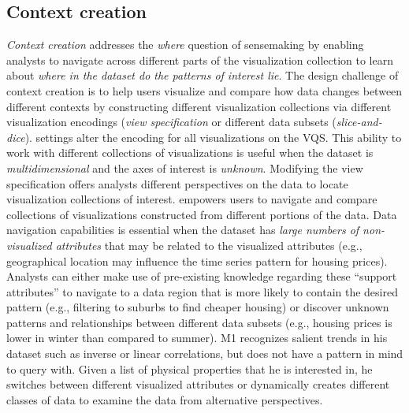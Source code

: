   \subsection{Context creation}
  \textit{Context creation} addresses the \textit{where} question of sensemaking by enabling analysts to navigate across different parts of the visualization collection to learn about \textit{where in the dataset do the patterns of interest lie}. The design challenge of context creation is to help users visualize and compare how data changes between different contexts by constructing different visualization collections via different visualization encodings (\textit{view specification} or different data subsets (\textit{slice-and-dice}).%
   settings alter the encoding for all visualizations on the VQS. This ability to work with different collections of visualizations is useful when the dataset is \emph{multidimensional} and the axes of interest is \emph{unknown}. Modifying the view specification offers analysts different perspectives on the data to locate visualization collections of interest.
   empowers users to navigate and compare collections of visualizations constructed from different portions of the data. Data navigation capabilities is essential when the dataset has \emph{large numbers of non-visualized attributes} that may be related to the visualized attributes (e.g., geographical location may influence the time series pattern for housing prices). Analysts can either make use of pre-existing knowledge regarding these ``support attributes'' to navigate to a data region that is more likely to contain the desired pattern (e.g., filtering to suburbs to find cheaper housing) or discover unknown patterns and relationships between different data subsets (e.g., housing prices is lower in winter than compared to summer).%
   M1 recognizes salient trends in his dataset such as inverse or linear correlations, but does not have a pattern in mind to query with. Given a list of physical properties that he is interested in, he switches between different visualized attributes or dynamically creates different classes of data to examine the data from alternative perspectives.
